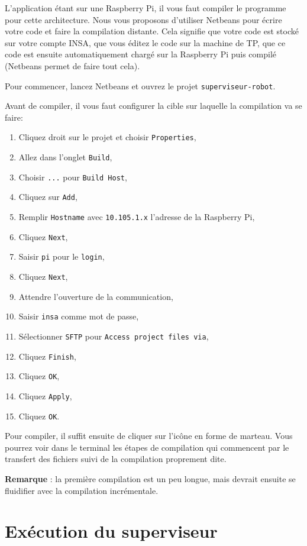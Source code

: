 \documentclass[11pt]{paper}
\newcommand{\raspi}{Raspberry Pi\xspace}
\begin{document}
L'application étant sur une \raspi, il vous faut compiler le programme pour cette architecture. Nous vous proposons d'utiliser Netbeans pour écrire votre code et faire la compilation distante. Cela signifie que votre code est stocké sur votre compte INSA, que vous éditez le code sur la machine de TP, que ce code est ensuite automatiquement chargé sur la \raspi puis compilé (Netbeans permet de faire tout cela).

Pour commencer, lancez Netbeans et ouvrez le projet {\tt superviseur-robot}.

Avant de compiler, il vous faut configurer la cible sur laquelle la compilation va se faire:
\begin{enumerate}
\item Cliquez droit sur le projet et choisir {\tt Properties},
\item Allez dans l'onglet {\tt Build},
\item Choisir {\tt ...} pour {\tt Build Host},
\item Cliquez sur {\tt Add},
\item Remplir {\tt Hostname} avec {\tt 10.105.1.x} l'adresse de la \raspi,
\item Cliquez {\tt Next},
\item Saisir {\tt pi} pour le {\tt login},
\item Cliquez {\tt Next},
\item Attendre l'ouverture de la communication,
\item Saisir {\tt insa} comme mot de passe,
\item Sélectionner {\tt  SFTP} pour {\tt Access project files via},
\item Cliquez {\tt Finish},
\item Cliquez {\tt OK},
\item Cliquez {\tt Apply},
\item Cliquez {\tt OK}.
\end{enumerate}

Pour compiler, il suffit ensuite de cliquer sur l'icône en forme de marteau. Vous pourrez voir dans le terminal les étapes de compilation qui commencent par le transfert des fichiers suivi de la compilation proprement dite.

{\bf Remarque} : la première compilation est un peu longue, mais devrait ensuite se fluidifier avec la compilation incrémentale.


\section{Exécution du superviseur}
\label{sec:utilisation}
\end{document}
